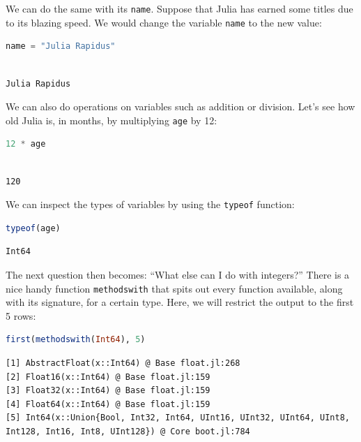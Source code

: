 \documentclass[
  notoc %
]{tufte-book}
\newcommand{\passthrough}[1]{#1}
\begin{document}
We can do the same with its \passthrough{\lstinline!name!}. Suppose that
Julia has earned some titles due to its blazing speed. We would change
the variable \passthrough{\lstinline!name!} to the new value:

\begin{lstlisting}[language=Julia]
name = "Julia Rapidus"
\end{lstlisting}

\begin{lstlisting}[language=Output]

Julia Rapidus

\end{lstlisting}

We can also do operations on variables such as addition or division.
Let's see how old Julia is, in months, by multiplying
\passthrough{\lstinline!age!} by 12:

\begin{lstlisting}[language=Julia]
12 * age
\end{lstlisting}

\begin{lstlisting}[language=Output]

120

\end{lstlisting}

We can inspect the types of variables by using the
\passthrough{\lstinline!typeof!} function:

\begin{lstlisting}[language=Julia]
typeof(age)
\end{lstlisting}

\begin{lstlisting}[language=Output]
Int64
\end{lstlisting}

The next question then becomes: ``What else can I do with integers?''
There is a nice handy function \passthrough{\lstinline!methodswith!}
that spits out every function available, along with its signature, for a
certain type. Here, we will restrict the output to the first 5 rows:

\begin{lstlisting}[language=Julia]
first(methodswith(Int64), 5)
\end{lstlisting}

\begin{lstlisting}[language=Output]
[1] AbstractFloat(x::Int64) @ Base float.jl:268
[2] Float16(x::Int64) @ Base float.jl:159
[3] Float32(x::Int64) @ Base float.jl:159
[4] Float64(x::Int64) @ Base float.jl:159
[5] Int64(x::Union{Bool, Int32, Int64, UInt16, UInt32, UInt64, UInt8, Int128, Int16, Int8, UInt128}) @ Core boot.jl:784
\end{lstlisting}
\end{document}
